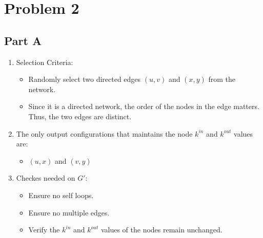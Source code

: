 \documentclass[12pt]{article}
\begin{document}
\section*{Problem 2}    

\subsection*{Part A}
\begin{enumerate}
    \item Selection Criteria:
    \begin{itemize}
        \item Randomly select two directed edges \( (u,v) \) and \( (x,y) \) from the network.
        \item Since it is a directed network, the order of the nodes in the edge matters. Thus, the two edges are distinct.
    \end{itemize}
    \item The only output configurations that maintains the node $k^{in}$ and $k^{out}$ values are:
    \begin{itemize}
        \item \( (u, x)\) and \( (v, y) \)
    \end{itemize}
    \item Checkes needed on $G'$:
    \begin{itemize}
        \item Ensure no self loops.
        \item Ensure no multiple edges.
        \item Verify the $k^{in}$ and $k^{out}$ values of the nodes remain unchanged.
    \end{itemize}
\end{enumerate}
\end{document}
